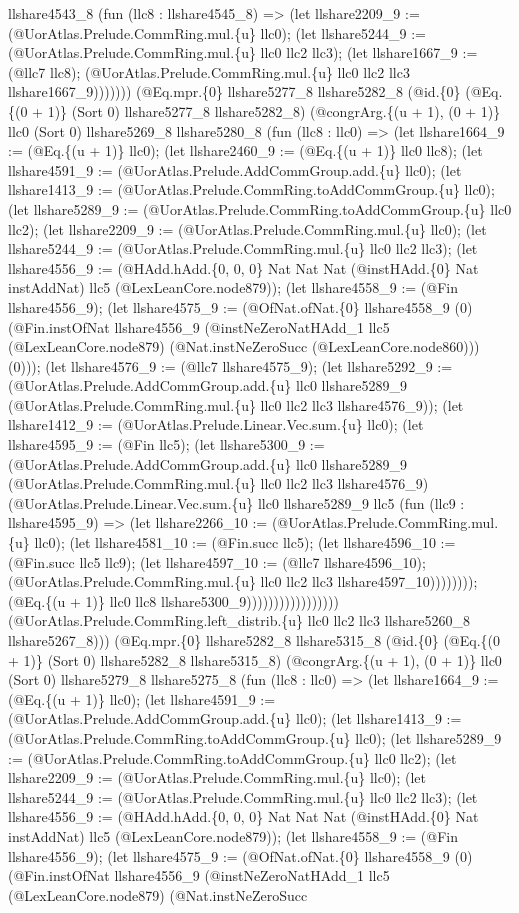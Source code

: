 \documentclass[11pt]{article}
\begin{document}
llshare4543\_8 (fun (llc8 : llshare4545\_8) => (let llshare2209\_9 := (@UorAtlas.Prelude.CommRing.mul.\{u\} llc0); (let llshare5244\_9 := (@UorAtlas.Prelude.CommRing.mul.\{u\} llc0 llc2 llc3); (let llshare1667\_9 := (@llc7 llc8); (@UorAtlas.Prelude.CommRing.mul.\{u\} llc0 llc2 llc3 llshare1667\_9))))))) (@Eq.mpr.\{0\} llshare5277\_8 llshare5282\_8 (@id.\{0\} (@Eq.\{(0 + 1)\} (Sort 0) llshare5277\_8 llshare5282\_8) (@congrArg.\{(u + 1), (0 + 1)\} llc0 (Sort 0) llshare5269\_8 llshare5280\_8 (fun (llc8 : llc0) => (let llshare1664\_9 := (@Eq.\{(u + 1)\} llc0); (let llshare2460\_9 := (@Eq.\{(u + 1)\} llc0 llc8); (let llshare4591\_9 := (@UorAtlas.Prelude.AddCommGroup.add.\{u\} llc0); (let llshare1413\_9 := (@UorAtlas.Prelude.CommRing.toAddCommGroup.\{u\} llc0); (let llshare5289\_9 := (@UorAtlas.Prelude.CommRing.toAddCommGroup.\{u\} llc0 llc2); (let llshare2209\_9 := (@UorAtlas.Prelude.CommRing.mul.\{u\} llc0); (let llshare5244\_9 := (@UorAtlas.Prelude.CommRing.mul.\{u\} llc0 llc2 llc3); (let llshare4556\_9 := (@HAdd.hAdd.\{0, 0, 0\} Nat Nat Nat (@instHAdd.\{0\} Nat instAddNat) llc5 (@LexLeanCore.node879)); (let llshare4558\_9 := (@Fin llshare4556\_9); (let llshare4575\_9 := (@OfNat.ofNat.\{0\} llshare4558\_9 (0) (@Fin.instOfNat llshare4556\_9 (@instNeZeroNatHAdd\_1 llc5 (@LexLeanCore.node879) (@Nat.instNeZeroSucc (@LexLeanCore.node860))) (0))); (let llshare4576\_9 := (@llc7 llshare4575\_9); (let llshare5292\_9 := (@UorAtlas.Prelude.AddCommGroup.add.\{u\} llc0 llshare5289\_9 (@UorAtlas.Prelude.CommRing.mul.\{u\} llc0 llc2 llc3 llshare4576\_9)); (let llshare1412\_9 := (@UorAtlas.Prelude.Linear.Vec.sum.\{u\} llc0); (let llshare4595\_9 := (@Fin llc5); (let llshare5300\_9 := (@UorAtlas.Prelude.AddCommGroup.add.\{u\} llc0 llshare5289\_9 (@UorAtlas.Prelude.CommRing.mul.\{u\} llc0 llc2 llc3 llshare4576\_9) (@UorAtlas.Prelude.Linear.Vec.sum.\{u\} llc0 llshare5289\_9 llc5 (fun (llc9 : llshare4595\_9) => (let llshare2266\_10 := (@UorAtlas.Prelude.CommRing.mul.\{u\} llc0); (let llshare4581\_10 := (@Fin.succ llc5); (let llshare4596\_10 := (@Fin.succ llc5 llc9); (let llshare4597\_10 := (@llc7 llshare4596\_10); (@UorAtlas.Prelude.CommRing.mul.\{u\} llc0 llc2 llc3 llshare4597\_10)))))))); (@Eq.\{(u + 1)\} llc0 llc8 llshare5300\_9))))))))))))))))) (@UorAtlas.Prelude.CommRing.left\_distrib.\{u\} llc0 llc2 llc3 llshare5260\_8 llshare5267\_8))) (@Eq.mpr.\{0\} llshare5282\_8 llshare5315\_8 (@id.\{0\} (@Eq.\{(0 + 1)\} (Sort 0) llshare5282\_8 llshare5315\_8) (@congrArg.\{(u + 1), (0 + 1)\} llc0 (Sort 0) llshare5279\_8 llshare5275\_8 (fun (llc8 : llc0) => (let llshare1664\_9 := (@Eq.\{(u + 1)\} llc0); (let llshare4591\_9 := (@UorAtlas.Prelude.AddCommGroup.add.\{u\} llc0); (let llshare1413\_9 := (@UorAtlas.Prelude.CommRing.toAddCommGroup.\{u\} llc0); (let llshare5289\_9 := (@UorAtlas.Prelude.CommRing.toAddCommGroup.\{u\} llc0 llc2); (let llshare2209\_9 := (@UorAtlas.Prelude.CommRing.mul.\{u\} llc0); (let llshare5244\_9 := (@UorAtlas.Prelude.CommRing.mul.\{u\} llc0 llc2 llc3); (let llshare4556\_9 := (@HAdd.hAdd.\{0, 0, 0\} Nat Nat Nat (@instHAdd.\{0\} Nat instAddNat) llc5 (@LexLeanCore.node879)); (let llshare4558\_9 := (@Fin llshare4556\_9); (let llshare4575\_9 := (@OfNat.ofNat.\{0\} llshare4558\_9 (0) (@Fin.instOfNat llshare4556\_9 (@instNeZeroNatHAdd\_1 llc5 (@LexLeanCore.node879) (@Nat.instNeZeroSucc 
\end{document}

